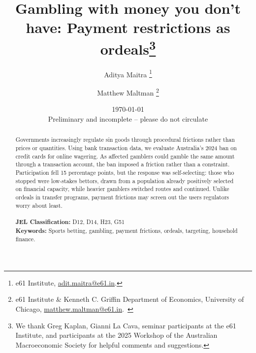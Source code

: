 \documentclass[12pt]{article}
\begin{document}
\hypersetup{pageanchor=false}


\title{{Gambling with money you don't have: Payment restrictions as ordeals}\thanks{We thank Greg Kaplan, Gianni La Cava, seminar participants at the e61 Institute, and participants at the 2025 Workshop of the Australian Macroeconomic Society for helpful comments and suggestions. }
}
\author{Aditya Maitra
\thanks{e61 Institute,
\href{mailto:adit.maitra@e61.in}{adit.maitra@e61.in}.}
\and \hspace{-0.1in} Matthew Maltman%
\thanks{e61 Institute \& Kenneth C. Griffin Department of Economics, University of Chicago, \href{mailto:matthew.maltman@e61.in}{matthew.maltman@e61.in}.~}
}
\date{\today \\ \textcolor{mediumelectricblue}{Preliminary and incomplete -- please do not circulate} \\}

\maketitle
\vspace{-0.3in}
\begin{abstract} 
\noindent
\noindent Governments increasingly regulate sin goods through procedural frictions rather than prices or quantities. Using bank transaction data, we evaluate Australia's 2024 ban on credit cards for online wagering. As affected gamblers could gamble the same amount through a transaction account, the ban imposed a friction rather than a constraint. Participation fell 15 percentage points, but the response was self-selecting: those who stopped were low-stakes bettors, drawn from a population already positively selected on financial capacity, while heavier gamblers switched routes and continued. Unlike ordeals in transfer programs, payment frictions may screen out the users regulators worry about least.
\\\\

\noindent\textbf{JEL Classification:} D12, D14, H23, G51 \\
\noindent\textbf{Keywords:} Sports betting, gambling, payment frictions, ordeals, targeting, household finance.
\thispagestyle{empty}
\end{abstract}
\end{document}
